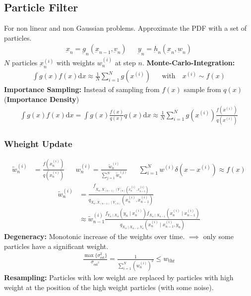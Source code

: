\begin{mdframed}[style=eqbox]
\subsection{Particle Filter}
For non linear and non Gaussian problems. Approximate the PDF with a set of particles.
\vspace*{-4pt}
\begin{align*}
  \underbar{x}_n = \underbar{g}_n(\underbar{x}_{n-1}, \underbar{v}_n) && \underbar{y}_n = \underbar{h}_n(\underbar{x}_n, \underbar{w}_n)
\end{align*}
$N$ particles $\underbar{x}_n^{(i)}$ with weights $w_n^{(i)}$ at step $n$.
\textbf{Monte-Carlo-Integration:}
\vspace*{-4pt}
\begin{align*}
  \int g(x) f(x) \text{d}x \approx \frac{1}{N} \sum_{i=1}^N g(x^{(i)}) && \text{with} \quad x^{(i)} \sim f(x)
\end{align*}
\textbf{Importance Sampling:} Instead of sampling from $f(x)$ sample from $q(x)$ (\textbf{Importance Density})
\vspace*{-4pt}
\begin{align*}
  \int g(x) f(x) \text{d}x = \int g(x) \frac{f(x)}{q(x)} q(x) \text{d}x \approx \frac{1}{N} \sum_{i=1}^N g(x^{(i)}) \frac{f(x^{(i)})}{q(x^{(i)})}
\end{align*}
\subsubsection{Wheight Update}
\vspace*{-12pt}
\begin{align*}
  \tilde{w}_n^{(i)} &= \frac{f(x_n^{(i)})}{q(x_n^{(i)})} && w_n^{(i)} = \frac{\tilde{w}_n^{(i)}}{\sum_{j=1}^N \tilde{w}_n^{(j)}} && \sum_{i=1}^N w^{(i)} \delta(x - x^{(i)}) \approx f(x)
\end{align*}
\begin{align*}
  \tilde{w}_n^{(i)} &= \frac{f_{X_n,X_{(n - 1)}\mid Y_{(n)}(x_n^{(i)}, x_{n-1}^{(i)})}}{q_{X_n,X_{(n - 1)}\mid Y_{(n)}}(x_n^{(i)}, x_{n-1}^{(i)})}\\
   &\approx \tilde{w}_{n-1}^{(i)} \frac{f_{Y_n \mid X_n}(y_n \mid x_n^{(i)})f_{X_n \mid X_{n - 1}}(x_n^{(i)} \mid x_{n-1}^{(i)})}{q_{X_n \mid X_{n - 1}, Y_n}(x_n^{(i)} \mid x_{n-1}^{(i)}, y_n)}
\end{align*}
\textbf{Degeneracy:} Monotonic increase of the weights over time. $\implies$ only some particles have a significant weight.
\begin{align*}
  \frac{\max\{\sigma_{\text{est}}^2\}}{\sigma_{\text{est}^2}} = \frac{1}{\sum^N_{i=1} (w_n^{(i)})^2} \leq w_{\text{thr}}
\end{align*}
\textbf{Resampling:} Particles with low weight are replaced by particles with high weight at the position of the high weight particles (with some noise).
\end{mdframed}

